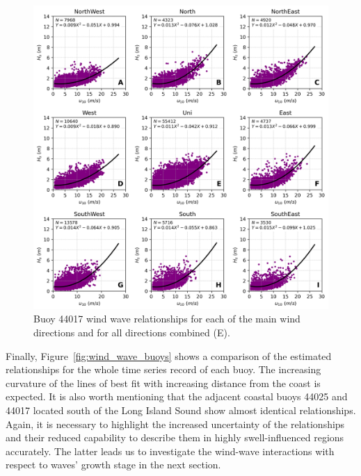 \begin{figure}[H]
\centering
\includegraphics[width=0.95\linewidth]{Figures/Chapter5/b44017_wind_wave.png}
\caption{Buoy 44017 wind wave relationships for each of the main wind directions and for all directions combined (E).}
\label{fig:wind_wave_44017}
\end{figure}


Finally, Figure~\ref{fig:wind_wave_buoys} shows a comparison of the estimated relationships for the whole time series record of each buoy. The increasing curvature of the lines of best fit with increasing distance from the coast is expected. It is also worth mentioning that the adjacent coastal buoys 44025 and 44017 located south of the Long Island Sound show almost identical relationships. Again, it is necessary to highlight the increased uncertainty of the relationships and their reduced capability to describe them in highly swell-influenced regions accurately. The latter leads us to investigate the wind-wave interactions with respect to waves' growth stage in the next section.



